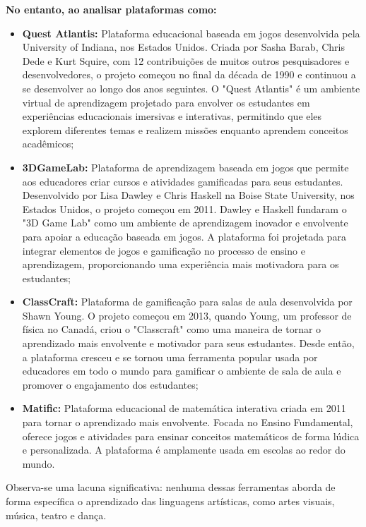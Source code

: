 \item \textbf{No entanto, ao analisar plataformas como: }
    \begin{itemize}[leftmargin=2em]
        \item \textbf{Quest Atlantis:} Plataforma educacional baseada em jogos desenvolvida pela University of Indiana, nos Estados Unidos. Criada por Sasha Barab, Chris Dede e Kurt Squire, com 12 contribuições de muitos outros pesquisadores e desenvolvedores, o projeto começou no final da década de 1990 e continuou a se desenvolver ao longo dos anos seguintes. O "Quest Atlantis" é um ambiente virtual de aprendizagem projetado para envolver os estudantes em experiências educacionais imersivas e interativas, permitindo que eles explorem diferentes temas e realizem missões enquanto aprendem conceitos acadêmicos; 
        \item \textbf{3DGameLab:} Plataforma de aprendizagem baseada em jogos que permite aos educadores criar cursos e atividades gamificadas para seus estudantes. Desenvolvido por Lisa Dawley e Chris Haskell na Boise State University, nos Estados Unidos, o projeto começou em 2011. Dawley e Haskell fundaram o "3D Game Lab" como um ambiente de aprendizagem inovador e envolvente para apoiar a educação baseada em jogos. A plataforma foi projetada para integrar elementos de jogos e gamificação no processo de ensino e aprendizagem, proporcionando uma experiência mais motivadora para os estudantes; 
        \item \textbf{ClassCraft:} Plataforma de gamificação para salas de aula desenvolvida por Shawn Young. O projeto começou em 2013, quando Young, um professor de física no Canadá, criou o "Classcraft" como uma maneira de tornar o aprendizado mais envolvente e motivador para seus estudantes. Desde então, a plataforma cresceu e se tornou uma ferramenta popular usada por educadores em todo o mundo para gamificar o ambiente de sala de aula e promover o engajamento dos estudantes;  
        \item \textbf{Matific:} Plataforma educacional de matemática interativa criada em 2011 para tornar o aprendizado mais envolvente. Focada no Ensino Fundamental, oferece jogos e atividades para ensinar conceitos matemáticos de forma lúdica e personalizada. A plataforma é amplamente usada em escolas ao redor do mundo. 
    \end{itemize}

Observa-se uma lacuna significativa: nenhuma dessas ferramentas aborda de forma específica o aprendizado das linguagens artísticas, como artes visuais, música, teatro e dança. 

